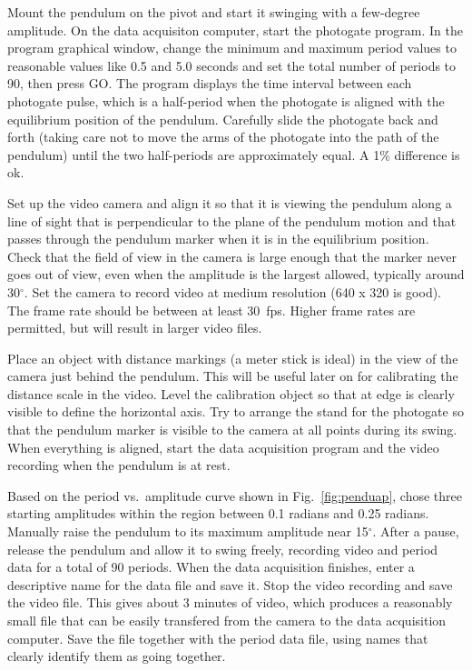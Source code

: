 \documentclass{revtex4}
\begin{document}
Mount the pendulum on the pivot and start it swinging with a few-degree
amplitude.  On the data acquisiton computer, start the photogate program.
In the program graphical window, change the minimum and maximum period
values to reasonable values like 0.5 and 5.0 seconds and set the total
number of periods to 90, then press GO.  The program displays the time
interval between each photogate pulse, which is a half-period when the
photogate is aligned with the equilibrium position of the pendulum.
Carefully slide the photogate back and forth (taking care not to move
the arms of the photogate into the path of the pendulum) until the two
half-periods are approximately equal.  A 1\% difference is ok.

Set up the video camera and align it so that it is viewing the pendulum
along a line of sight that is perpendicular to the plane of the pendulum
motion and that passes through the pendulum marker when it is in the
equilibrium position.  Check that the field of view in the camera is
large enough that the marker never goes out of view, even when the amplitude
is the largest allowed, typically around 30$^{\circ}$.  Set the camera to
record video at medium resolution (640 x 320 is good).  The frame rate
should be between at least 30~fps.  Higher frame rates are permitted, but
will result in larger video files.

Place an object with distance markings (a meter stick is ideal) in the
view of the camera just behind the pendulum.  This will be useful later
on for calibrating the distance scale in the video.  Level the calibration
object so that at edge is clearly visible to define the horizontal axis.
Try to arrange the stand for the photogate so that the pendulum marker
is visible to the camera at all points during its swing.
When everything is aligned, start the data acquisition program and the
video recording when the pendulum is at rest.

Based on the period vs.\ amplitude curve shown in Fig.~\ref{fig:penduap},
chose three starting amplitudes within the region between 0.1 radians
and 0.25 radians.  Manually raise the pendulum to its maximum amplitude
near 15$^{\circ}$.  After a pause, release the pendulum and allow it to
swing freely, recording video and period data for a total of 90 periods.
When the data acquisition finishes, enter a descriptive name for the
data file and save it.  Stop the video recording and save the video file.
This gives about 3 minutes of video, which produces a reasonably small
file that can be easily transfered from the camera to the data acquisition
computer.  Save the file together with the period data file, using names
that clearly identify them as going together.
\end{document}
